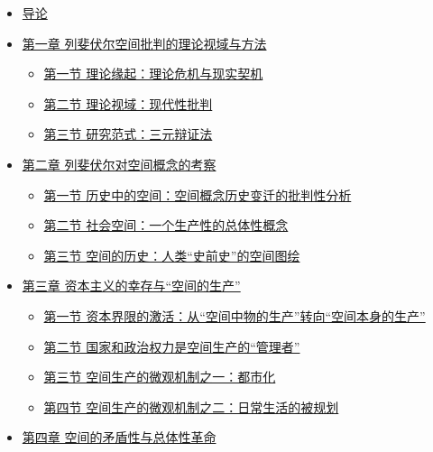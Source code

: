 \documentclass[UTF8, fontset = sourcesans, a4paper, oneside, zihao =
-4, scheme=chinese, no-math, space=true]{ctexbook}
\newcommand{\tightlist}{%
  \setlength{\itemsep}{0pt}\setlength{\parskip}{0pt}}
\begin{document}
\begin{itemize}
\tightlist
\item
  \protect\hyperlink{part0004.htmlux5cux23a004}{导论}
\item
  \protect\hyperlink{part0005_split_000.htmlux5cux23a005}{第一章
  列斐伏尔空间批判的理论视域与方法}

  \begin{itemize}
  \tightlist
  \item
    \protect\hyperlink{part0005_split_001.htmlux5cux23b001}{第一节
    理论缘起：理论危机与现实契机}
  \item
    \protect\hyperlink{part0005_split_002.htmlux5cux23b002}{第二节
    理论视域：现代性批判}
  \item
    \protect\hyperlink{part0005_split_003.htmlux5cux23b003}{第三节
    研究范式：三元辩证法}
  \end{itemize}
\item
  \protect\hyperlink{part0006_split_000.htmlux5cux23a006}{第二章
  列斐伏尔对空间概念的考察}

  \begin{itemize}
  \tightlist
  \item
    \protect\hyperlink{part0006_split_001.htmlux5cux23b004}{第一节
    历史中的空间：空间概念历史变迁的批判性分析}
  \item
    \protect\hyperlink{part0006_split_002.htmlux5cux23b005}{第二节
    社会空间：一个生产性的总体性概念}
  \item
    \protect\hyperlink{part0006_split_003.htmlux5cux23b006}{第三节
    空间的历史：人类``史前史''的空间图绘}
  \end{itemize}
\item
  \protect\hyperlink{part0007_split_000.htmlux5cux23a007}{第三章
  资本主义的幸存与``空间的生产''}

  \begin{itemize}
  \tightlist
  \item
    \protect\hyperlink{part0007_split_001.htmlux5cux23b007}{第一节
    资本界限的激活：从``空间中物的生产''转向``空间本身的生产''}
  \item
    \protect\hyperlink{part0007_split_002.htmlux5cux23b008}{第二节
    国家和政治权力是空间生产的``管理者''}
  \item
    \protect\hyperlink{part0007_split_003.htmlux5cux23b009}{第三节
    空间生产的微观机制之一：都市化}
  \item
    \protect\hyperlink{part0007_split_004.htmlux5cux23b010}{第四节
    空间生产的微观机制之二：日常生活的被规划}
  \end{itemize}
\item
  \protect\hyperlink{part0008_split_000.htmlux5cux23a008}{第四章
  空间的矛盾性与总体性革命}


\end{itemize}
\end{document}
